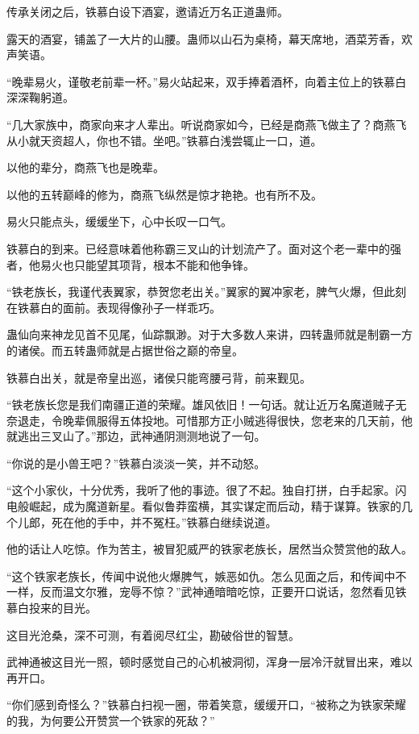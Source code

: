 \begin{this_body}
传承关闭之后，铁慕白设下酒宴，邀请近万名正道蛊师。

露天的酒宴，铺盖了一大片的山腰。蛊师以山石为桌椅，幕天席地，酒菜芳香，欢声笑语。

“晚辈易火，谨敬老前辈一杯。”易火站起来，双手捧着酒杯，向着主位上的铁慕白深深鞠躬道。

“几大家族中，商家向来才人辈出。听说商家如今，已经是商燕飞做主了？商燕飞从小就天资超人，你也不错。坐吧。”铁慕白浅尝辄止一口，道。

以他的辈分，商燕飞也是晚辈。

以他的五转巅峰的修为，商燕飞纵然是惊才艳艳。也有所不及。

易火只能点头，缓缓坐下，心中长叹一口气。

铁慕白的到来。已经意味着他称霸三叉山的计划流产了。面对这个老一辈中的强者，他易火也只能望其项背，根本不能和他争锋。

“铁老族长，我谨代表翼家，恭贺您老出关。”翼家的翼冲家老，脾气火爆，但此刻在铁慕白的面前。表现得像孙子一样乖巧。

蛊仙向来神龙见首不见尾，仙踪飘渺。对于大多数人来讲，四转蛊师就是制霸一方的诸侯。而五转蛊师就是占据世俗之巅的帝皇。

铁慕白出关，就是帝皇出巡，诸侯只能弯腰弓背，前来觐见。

“铁老族长您是我们南疆正道的荣耀。雄风依旧！一句话。就让近万名魔道贼子无奈退走，令晚辈佩服得五体投地。可惜那方正小贼逃得很快，您老来的几天前，他就逃出三叉山了。”那边，武神通阴测测地说了一句。

“你说的是小兽王吧？”铁慕白淡淡一笑，并不动怒。

“这个小家伙，十分优秀，我听了他的事迹。很了不起。独自打拼，白手起家。闪电般崛起，成为魔道新星。看似鲁莽蛮横，其实谋定而后动，精于谋算。铁家的几个儿郎，死在他的手中，并不冤枉。”铁慕白继续说道。

他的话让人吃惊。作为苦主，被冒犯威严的铁家老族长，居然当众赞赏他的敌人。

“这个铁家老族长，传闻中说他火爆脾气，嫉恶如仇。怎么见面之后，和传闻中不一样，反而温文尔雅，宠辱不惊？”武神通暗暗吃惊，正要开口说话，忽然看见铁慕白投来的目光。

这目光沧桑，深不可测，有着阅尽红尘，勘破俗世的智慧。

武神通被这目光一照，顿时感觉自己的心机被洞彻，浑身一层冷汗就冒出来，难以再开口。

“你们感到奇怪么？”铁慕白扫视一圈，带着笑意，缓缓开口，“被称之为铁家荣耀的我，为何要公开赞赏一个铁家的死敌？”


\end{this_body}
